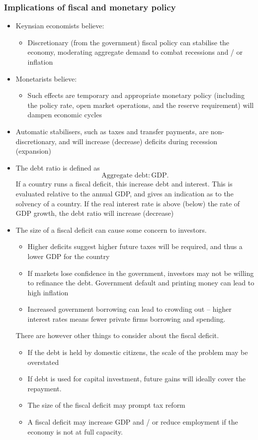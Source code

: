 \documentclass[../notes_compiled.tex]{subfiles}
\begin{document}
\subsubsection{Implications of fiscal and monetary policy}
\begin{itemize}
\item Keynsian economists believe:
\begin{itemize}
\item Discretionary (from the government) fiscal policy can stabilise the economy, moderating aggregate demand to combat recessions and / or inflation
\end{itemize}

\item Monetarists believe:
\begin{itemize}
\item Such effects are temporary and appropriate monetary policy (including the policy rate, open market operations, and the reserve requirement) will dampen economic cycles
\end{itemize}

\item Automatic stabilisers, such as taxes and transfer payments, are non-discretionary, and will increase (decrease) deficits during recession (expansion)

\item The debt ratio is defined as
\begin{equation}
\text{Aggregate debt} : \text{GDP}.
\end{equation}
If a country runs a fiscal deficit, this increase debt and interest. This is evaluated relative to the annual GDP, and gives an indication as to the solvency of a country. If the real interest rate is above (below) the rate of GDP growth, the debt ratio will increase (decrease)
\item The size of a fiscal deficit can cause some concern to investors.
\begin{itemize}
\item Higher deficits suggest higher future taxes will be required, and thus a lower GDP for the country
\item If markets lose confidence in the government, investors may not be willing to refinance the debt. Government default and printing money can lead to high inflation
\item Increased government borrowing can lead to crowding out -- higher interest rates means fewer private firms borrowing and spending.
\end{itemize}
There are however other things to consider about the fiscal deficit.
\begin{itemize}
\item If the debt is held by domestic citizens, the scale of the problem may be overstated
\item If debt is used for capital investment, future gains will ideally cover the repayment.
\item The size of the fiscal deficit may prompt tax reform
\item A fiscal deficit may increase GDP and / or reduce employment if the economy is not at full capacity. 
\end{itemize}
\end{itemize}
\end{document}
